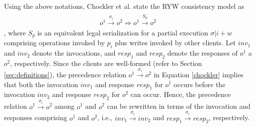 \documentclass[journal,compsoc]{IEEEtran}
\begin{document}
  \par Using the above notations, Chockler et al. state the RYW consistency model as  
  \begin{align}
  \begin{split}\label{chockler}
  \mathit{o}^1 \xrightarrow{\sigma_i} \mathit{o}^2 \Rightarrow \mathit{o}^1 \xrightarrow{S_p} \mathit{o}^2
  \end{split}
  \end{align}, %
 where ${S_p}$ is an equivalent legal serialization  for a partial execution  $\sigma |i + w$ comprising 
   operations invoked by $p_i$ plus writes invoked by other clients. %
 Let $\mathit{inv}_1$ and  $\mathit{inv}_2$ denote the invocations, and $\mathit{resp}_1$ and  $\mathit{resp}_2$ denote the responses  of  $\mathit{o}^1$ a $\mathit{o}^2$, respectively.  Since the clients are well-formed (refer to Section  \ref{sec:definitions}), the precedence relation  $\mathit{o}^1 \xrightarrow{\sigma_i} \mathit{o}^2$ %
   in   Equation \ref{chockler}  implies that  both the  invocation $\mathit{inv}_1$ and response $\mathit{resp}_1$   for $\mathit{o}^1$ occurs before the invocation $\mathit{inv}_2$ and response $\mathit{resp}_2$ for $\mathit{o}^2$ can occur.  Hence, the precedence relation $ \mathit{o}^1 \xrightarrow{\sigma_i} \mathit{o}^2 $ among $\mathit{o}^1$ and
 $\mathit{o}^2$  can be rewritten in terms of the invocation and responses comprising  $\mathit{o}^1$ and
 $\mathit{o}^2$, i.e.,  $ \mathit{inv}_1 \xrightarrow{\sigma_i} \mathit{inv}_2 $ and $ \mathit{resp}_1 \xrightarrow{\sigma_i} \mathit{resp}_2 $, respectively. 
\end{document}
